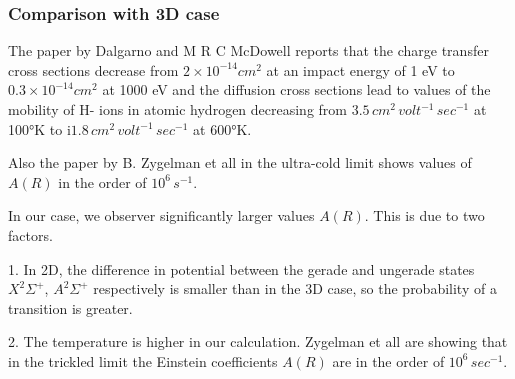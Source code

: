 \subsubsection{Comparison with 3D case}

The paper by Dalgarno and  M R C McDowell \cite{DalgarnoMcDowel} reports that the charge transfer cross sections decrease from $ 2\times 10^{-14} cm^2 $ at an impact energy of 1 eV to $ 0.3\times 10^{-14} cm^2 $ at 1000 eV and the diffusion cross sections lead to values of the mobility of H- ions in atomic hydrogen decreasing from $ 3.5\,cm^2\,volt^{-1}\,sec^{-1} $ at 100°K to i$ 1.8\,cm^2\,volt^{-1}\,sec^{-1} $ at 600°K.

Also the paper by B. Zygelman et all \cite{ZL} in the ultra-cold limit shows values of $ A(R)$ in the order of $ 10^6\,s^{-1} $.

In our case, we observer significantly larger values $ A(R) $. This is due to two factors.

1. In 2D, the difference in potential between the gerade and ungerade states $ X^2\Sigma^+ $, $ A^2\Sigma^+ $ respectively is smaller than in the 3D case, so the probability of a transition is greater.

2. The temperature is higher in our calculation. Zygelman et all \cite{ZL} are showing that in the trickled limit the Einstein coefficients $ A(R) $ are in the order of $ 10^6\, sec^{-1} $.
